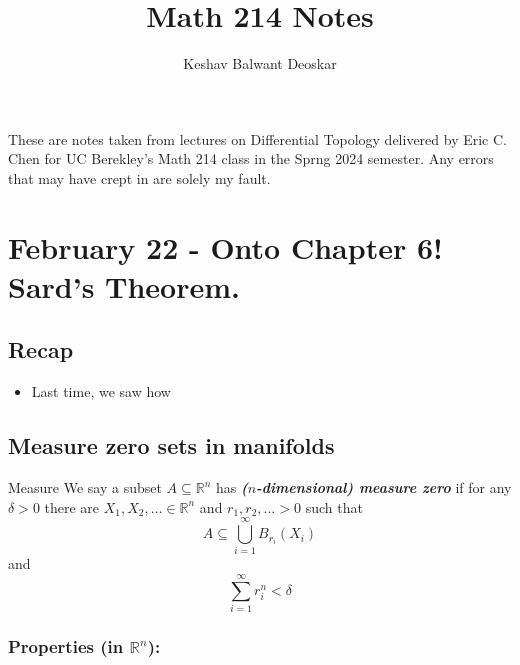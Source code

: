 \documentclass{article}
\title{Math 214 Notes}
\author{Keshav Balwant Deoskar}
\newcommand{\R}{\mathbb{R}}
\begin{document}
\maketitle

These are notes taken from lectures on Differential Topology delivered by Eric C. Chen for UC Berekley's Math 214 class in the Sprng 2024 semester. Any errors that may have crept in are solely my fault.

\tableofcontents

\pagebreak

\section{February 22 - Onto Chapter 6! Sard's Theorem.}

\vskip 1cm
\subsection*{Recap}
\begin{itemize}
  \item Last time, we saw how
\end{itemize}

\subsection{Measure zero sets in manifolds}
\vskip 0.5cm
\begin{mathdefinitionbox}{Measure}
  We say a subset $A \subseteq \R^n$ has \emph{\textbf{($n$-dimensional) measure zero}} if for any $\delta > 0$ there are $X_1, X_2, \dots \in \R^n$ and $r_1, r_2, \dots > 0$ such that 
  \[ A \subseteq \bigcup_{i = 1}^{\infty} B_{{r_i}}(X_i) \]
  and 
  \[ \sum_{i = 1}^{\infty} r_i^{n} < \delta  \] 
\end{mathdefinitionbox}

\vskip 0.5cm
\subsubsection*{Properties (in $\R^n$):}
\end{document}
